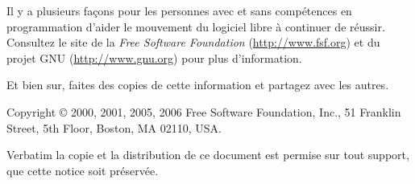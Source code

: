 \documentclass[12pt]{article}
\begin{document}
Il y a plusieurs façons pour les personnes avec et sans compétences en
programmation d'aider le mouvement du logiciel libre à continuer de réussir.
Consultez le site de la \textit{Free Software Foundation}
(\url{http://www.fsf.org}) et du projet GNU (\url{http://www.gnu.org}) pour
plus d'information.

Et bien sur, faites des copies de cette information et partagez avec les
autres.



\vspace{0.3in}

{\small

\noindent Copyright \copyright\/ 2000, 2001, 2005, 2006 Free Software Foundation, Inc., 51
Franklin Street, 5th Floor, Boston, MA 02110, USA.

Verbatim la copie et la distribution de ce document est permise sur tout support,
que cette notice soit préservée.

}
\end{document}
